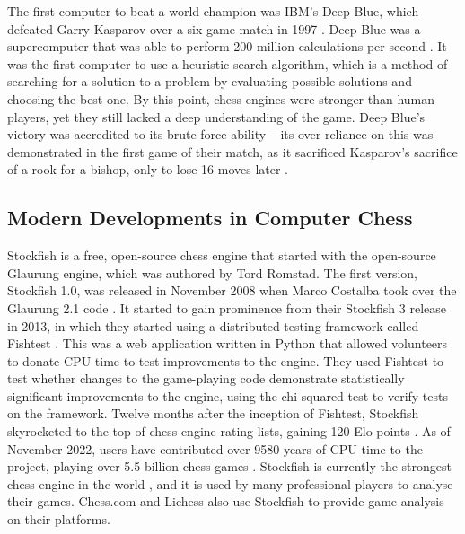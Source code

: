 \documentclass[%
 superscriptaddress,
showpacs,preprintnumbers,
 amsmath,
 amssymb,
 aps,
 pra,
showkeys,
onecolumn,
notitlepage,
11pt,
tightenlines      %
]{revtex4-1}
\begin{document}
The first computer to beat a world champion was IBM's Deep Blue, which defeated Garry Kasparov over a six-game match in 1997 \cite{seirawan1997implications}. Deep Blue was a supercomputer that was able to perform 200 million calculations per second \cite{strogatz2018one}. It was the first computer to use a heuristic search algorithm, which is a method of searching for a solution to a problem by evaluating possible solutions and choosing the best one. By this point, chess engines were stronger than human players, yet they still lacked a deep understanding of the game. Deep Blue's victory was accredited to its brute-force ability -- its over-reliance on this was demonstrated in the first game of their match, as it sacrificed Kasparov's sacrifice of a rook for a bishop, only to lose 16 moves later \cite{strogatz2018one}.

\subsection{Modern Developments in Computer Chess}
Stockfish is a free, open-source chess engine that started with the open-source Glaurung engine, which was authored by Tord Romstad. The first version, Stockfish 1.0, was released in November 2008 when Marco Costalba took over the Glaurung 2.1 code \cite{aboutStockfish}. It started to gain prominence from their Stockfish 3 release in 2013, in which they started using a distributed testing framework called Fishtest \cite{fishtestDistributedTestingFramework}. This was a web application written in Python that allowed volunteers to donate CPU time to test improvements to the engine. They used Fishtest to test whether changes to the game-playing code demonstrate statistically significant improvements to the engine, using the chi-squared test to verify tests on the framework. Twelve months after the inception of Fishtest, Stockfish skyrocketed to the top of chess engine rating lists, gaining 120 Elo points \cite{stockfishRatingsAfterFishtest}. As of November 2022, users have contributed over 9580 years of CPU time to the project, playing over 5.5 billion chess games \cite{fishtestUsers}. Stockfish is currently the strongest chess engine in the world \cite{computerChessRatingLists}, and it is used by many professional players to analyse their games. Chess.com and Lichess also use Stockfish to provide game analysis on their platforms.
\end{document}
